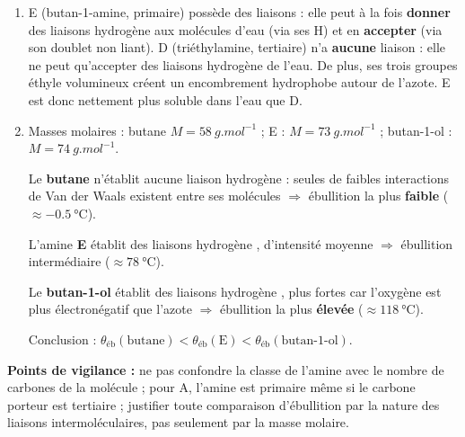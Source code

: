 \documentclass[11pt]{article}
\begin{document}
\begin{corrige}
\begin{enumerate}
\begin{itemize}
\item E :  ($M = \SI{73}{g.mol^{-1}}$).
\end{itemize}
A et E ont la \textbf{même formule brute}  mais des formules semi-développées différentes : ce sont des \textbf{isomères}. Comme leurs chaînes carbonées sont différentes (ramifiée pour A, linéaire pour E), il s'agit d'une \textbf{isomérie de chaîne}.
\item E (butan-1-amine, primaire) possède des liaisons  : elle peut à la fois \textbf{donner} des liaisons hydrogène aux molécules d'eau (via ses H) et en \textbf{accepter} (via son doublet non liant). D (triéthylamine, tertiaire) n'a \textbf{aucune} liaison  : elle ne peut qu'accepter des liaisons hydrogène de l'eau. De plus, ses trois groupes éthyle volumineux créent un encombrement hydrophobe autour de l'azote. E est donc nettement plus soluble dans l'eau que D.
\item Masses molaires : butane $M = \SI{58}{g.mol^{-1}}$ ; E : $M = \SI{73}{g.mol^{-1}}$ ; butan-1-ol : $M = \SI{74}{g.mol^{-1}}$.

Le \textbf{butane} n'établit aucune liaison hydrogène : seules de faibles interactions de Van der Waals existent entre ses molécules $\Rightarrow$ ébullition la plus \textbf{faible} ($\approx \SI{-0,5}{\celsius}$).

L'amine \textbf{E} établit des liaisons hydrogène , d'intensité moyenne $\Rightarrow$ ébullition intermédiaire ($\approx \SI{78}{\celsius}$).

Le \textbf{butan-1-ol} établit des liaisons hydrogène , plus fortes car l'oxygène est plus électronégatif que l'azote $\Rightarrow$ ébullition la plus \textbf{élevée} ($\approx \SI{118}{\celsius}$).

Conclusion : $\theta_{\text{éb}}(\text{butane}) < \theta_{\text{éb}}(\text{E}) < \theta_{\text{éb}}(\text{butan-1-ol})$.
\end{enumerate}
\textbf{Points de vigilance :} ne pas confondre la classe de l'amine avec le nombre de carbones de la molécule ; pour A, l'amine est primaire même si le carbone porteur est tertiaire ; justifier toute comparaison d'ébullition par la nature des liaisons intermoléculaires, pas seulement par la masse molaire.
\end{corrige}
\end{document}
